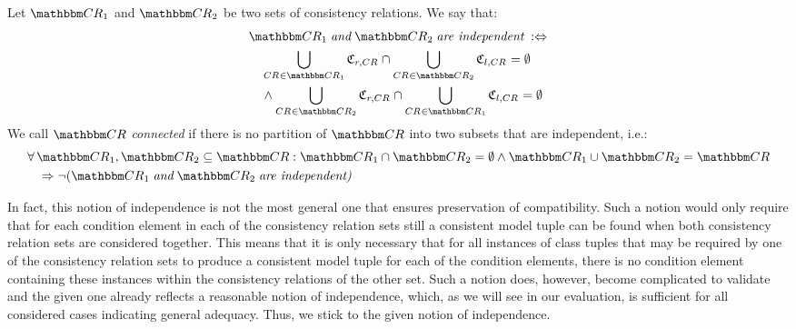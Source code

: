 \begin{definition}
    \label{def:independence}
    Let $\consistencyrelationset{CR}_{1}$ and $\consistencyrelationset{CR}_{2}$ be two sets of consistency relations. We say that:
    \begin{align*}
        &
        \consistencyrelationset{CR}_{1} \andmath \consistencyrelationset{CR}_{2} \mathtextspacearound{are independent} \equivalentperdefinition \\
        & \formulaskip
        \bigcup_{\consistencyrelation{CR}{} \in \consistencyrelationset{CR}_1} \classtuple{C}{r,\consistencyrelation{CR}{}} \cap \bigcup_{\consistencyrelation{CR}{} \in \consistencyrelationset{CR}_2} \classtuple{C}{l,\consistencyrelation{CR}{}} = \emptyset \\
        & \formulaskip
        \land 
        \bigcup_{\consistencyrelation{CR}{} \in \consistencyrelationset{CR}_2} \classtuple{C}{r,\consistencyrelation{CR}{}} \cap \bigcup_{\consistencyrelation{CR}{} \in \consistencyrelationset{CR}_1} \classtuple{C}{l,\consistencyrelation{CR}{}} = \emptyset
    \end{align*}
    We call $\consistencyrelationset{CR}$ \emph{connected} if there is no partition of $\consistencyrelationset{CR}$ into two subsets that are independent, i.e.:
    \begin{align*}
        &
        \forall \consistencyrelationset{CR}_{1}, \consistencyrelationset{CR}_{2} \subseteq \consistencyrelationset{CR} :
        \consistencyrelationset{CR}_{1} \cap \consistencyrelationset{CR}_{2} = \emptyset \land \consistencyrelationset{CR}_{1} \cup \consistencyrelationset{CR}_{2} = \consistencyrelationset{CR}  \\
        & \formulaskip
        \Rightarrow \neg (\consistencyrelationset{CR}_{1} \andmath \consistencyrelationset{CR}_{2} \mathtextspacearound{are independent)}
    \end{align*}
\end{definition}

In fact, this notion of independence is not the most general one that ensures preservation of compatibility.
Such a notion would only require that for each condition element in each of the consistency relation sets still a consistent model tuple can be found when both consistency relation sets are considered together.
This means that it is only necessary that for all instances of class tuples that may be required by one of the consistency relation sets to produce a consistent model tuple for each of the condition elements, there is no condition element containing these instances within the consistency relations of the other set.
Such a notion does, however, become complicated to validate and the given one already reflects a reasonable notion of independence, which, as we will see in our evaluation, is sufficient for all considered cases indicating general adequacy.
Thus, we stick to the given notion of independence.


